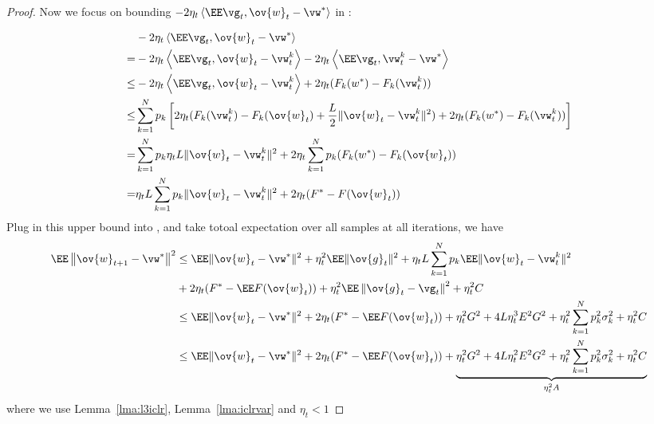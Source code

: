 \begin{proof}
Now we focus on bounding $-2 \eta_{t} \left< \EE \vg_{t}, \ov{w}_{t}-\vw^{*}\right>$ in \eq{\ref{eq:expandsgd}}: 

\begin{align*}
	& -2 \eta_{t} \left<\EE \vg_{t}, \ov{w}_{t}-\vw^{*}\right> \\
 =  & -2 \eta_{t} \left<\EE \vg_{t}, \ov{w}_{t}- \vw^{k}_t \right> -2 \eta_{t} \left<\EE \vg_{t}, \vw^{k}_t - \vw^{*}\right>\\
 \leq & -2 \eta_{t} \left<\EE \vg_{t}, \ov{w}_{t}- \vw^{k}_t \right> + 2 \eta_{t} (F_k(w^*) - F_k(\vw^{k}_t))\\
 \leq &\sum_{k=1}^N p_k \left[2 \eta_{t} (F_k(\vw^{k}_t) - F_k(\ov{w}_t) + \frac{L}{2} \|\ov{w}_t - \vw^{k}_t\|^2 ) + 2 \eta_{t} (F_k(w^*) - F_k(\vw^{k}_t))\right]\\
 = & \sum_{k=1}^N p_k \eta_t L \|\ov{w}_t - \vw^{k}_t\|^2 + 2 \eta_{t} \sum_{k=1}^N p_k (F_k(w^*) - F_k(\ov{w}_t))\\
 = &  \eta_t L \sum_{k=1}^N p_k \|\ov{w}_t - \vw^{k}_t\|^2 + 2 \eta_{t} (F^* - F(\ov{w}_t))
\end{align*}
Plug in this upper bound into \eq{\ref{eq:expandsgd}}, \eq{\ref{eq:sgdcvxsmth1}} and take totoal expectation over all samples at all iterations, we have
\begin{align}
\EE\left\|\ov{w}_{t+1}-\vw^{*}\right\|^2 &\leq \EE\|\ov{w}_{t}-\vw^{*}\|^{2}+\eta_{t}^{2} \EE\| \ov{g}_{t} \|^{2} + \eta_t L \sum_{k=1}^N p_k \EE \|\ov{w}_t - \vw^{k}_t\|^2 \nonumber \\
& + 2 \eta_{t} (F^* - \EE F(\ov{w}_t)) + \eta_{t}^2\EE\left\| \ov{g}_t -  \vg_{t}\right\|^2+ \eta_t^2 C\\
&\leq \EE\|\ov{w}_{t}-\vw^{*}\|^{2} + 2 \eta_{t} (F^* - \EE F(\ov{w}_t)) + \eta_{t}^{2} G^2 +4 L \eta_{t}^{3}E^{2} G^{2} + \eta_{t}^{2}\sum_{k=1}^{N} p_{k}^{2}\sigma_k^2 + \eta_t^2 C\\
&\leq \EE\|\ov{w}_{t}-\vw^{*}\|^{2} + 2 \eta_{t} (F^* - \EE F(\ov{w}_t)) + \underbrace{\eta_{t}^{2} G^2 +4 L \eta_{t}^{2}E^{2} G^{2} + \eta_{t}^{2}\sum_{k=1}^{N} p_{k}^{2}\sigma_k^2 + \eta_t^2 C}_{\eta_t^2 A}
\label{eq:cvxsgd1}
\end{align}
where we use Lemma~\ref{lma:l3iclr}, Lemma~\ref{lma:iclrvar} and $\eta_t < 1$


\end{proof}
